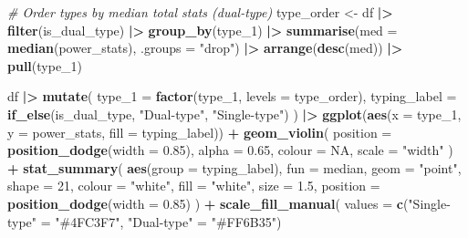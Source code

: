 \documentclass[
]{article}
\newenvironment{Shaded}{\begin{snugshade}}{\end{snugshade}}
\newcommand{\AttributeTok}[1]{\textcolor[rgb]{0.13,0.29,0.53}{#1}}
\newcommand{\CommentTok}[1]{\textcolor[rgb]{0.56,0.35,0.01}{\textit{#1}}}
\newcommand{\ConstantTok}[1]{\textcolor[rgb]{0.56,0.35,0.01}{#1}}
\newcommand{\DecValTok}[1]{\textcolor[rgb]{0.00,0.00,0.81}{#1}}
\newcommand{\FloatTok}[1]{\textcolor[rgb]{0.00,0.00,0.81}{#1}}
\newcommand{\FunctionTok}[1]{\textcolor[rgb]{0.13,0.29,0.53}{\textbf{#1}}}
\newcommand{\NormalTok}[1]{#1}
\newcommand{\OtherTok}[1]{\textcolor[rgb]{0.56,0.35,0.01}{#1}}
\newcommand{\SpecialCharTok}[1]{\textcolor[rgb]{0.81,0.36,0.00}{\textbf{#1}}}
\newcommand{\StringTok}[1]{\textcolor[rgb]{0.31,0.60,0.02}{#1}}
\begin{document}
\begin{Shaded}
\begin{Highlighting}[]
\CommentTok{\# Order types by median total stats (dual{-}type)}
\NormalTok{type\_order }\OtherTok{\textless{}{-}}\NormalTok{ df }\SpecialCharTok{|\textgreater{}}
  \FunctionTok{filter}\NormalTok{(is\_dual\_type) }\SpecialCharTok{|\textgreater{}}
  \FunctionTok{group\_by}\NormalTok{(type\_1) }\SpecialCharTok{|\textgreater{}}
  \FunctionTok{summarise}\NormalTok{(}\AttributeTok{med =} \FunctionTok{median}\NormalTok{(power\_stats), }\AttributeTok{.groups =} \StringTok{"drop"}\NormalTok{) }\SpecialCharTok{|\textgreater{}}
  \FunctionTok{arrange}\NormalTok{(}\FunctionTok{desc}\NormalTok{(med)) }\SpecialCharTok{|\textgreater{}}
  \FunctionTok{pull}\NormalTok{(type\_1)}

\NormalTok{df }\SpecialCharTok{|\textgreater{}}
  \FunctionTok{mutate}\NormalTok{(}
    \AttributeTok{type\_1       =} \FunctionTok{factor}\NormalTok{(type\_1, }\AttributeTok{levels =}\NormalTok{ type\_order),}
    \AttributeTok{typing\_label =} \FunctionTok{if\_else}\NormalTok{(is\_dual\_type, }\StringTok{"Dual{-}type"}\NormalTok{, }\StringTok{"Single{-}type"}\NormalTok{)}
\NormalTok{  ) }\SpecialCharTok{|\textgreater{}}
  \FunctionTok{ggplot}\NormalTok{(}\FunctionTok{aes}\NormalTok{(}\AttributeTok{x =}\NormalTok{ type\_1, }\AttributeTok{y =}\NormalTok{ power\_stats, }\AttributeTok{fill =}\NormalTok{ typing\_label)) }\SpecialCharTok{+}
  \FunctionTok{geom\_violin}\NormalTok{(}
    \AttributeTok{position =} \FunctionTok{position\_dodge}\NormalTok{(}\AttributeTok{width =} \FloatTok{0.85}\NormalTok{),}
    \AttributeTok{alpha =} \FloatTok{0.65}\NormalTok{, }\AttributeTok{colour =} \ConstantTok{NA}\NormalTok{, }\AttributeTok{scale =} \StringTok{"width"}
\NormalTok{  ) }\SpecialCharTok{+}
  \FunctionTok{stat\_summary}\NormalTok{(}
    \FunctionTok{aes}\NormalTok{(}\AttributeTok{group =}\NormalTok{ typing\_label),}
    \AttributeTok{fun =}\NormalTok{ median, }\AttributeTok{geom =} \StringTok{"point"}\NormalTok{, }\AttributeTok{shape =} \DecValTok{21}\NormalTok{,}
    \AttributeTok{colour =} \StringTok{"white"}\NormalTok{, }\AttributeTok{fill =} \StringTok{"white"}\NormalTok{, }\AttributeTok{size =} \FloatTok{1.5}\NormalTok{,}
    \AttributeTok{position =} \FunctionTok{position\_dodge}\NormalTok{(}\AttributeTok{width =} \FloatTok{0.85}\NormalTok{)}
\NormalTok{  ) }\SpecialCharTok{+}
  \FunctionTok{scale\_fill\_manual}\NormalTok{(}
    \AttributeTok{values =} \FunctionTok{c}\NormalTok{(}\StringTok{"Single{-}type"} \OtherTok{=} \StringTok{"\#4FC3F7"}\NormalTok{, }\StringTok{"Dual{-}type"} \OtherTok{=} \StringTok{"\#FF6B35"}\NormalTok{)}

\end{Highlighting}
\end{Shaded}
\end{document}

